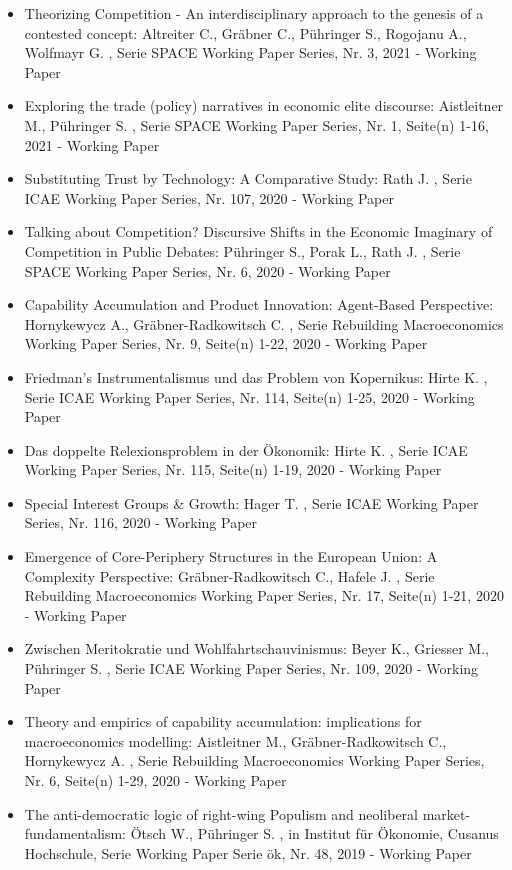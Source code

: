 \begin{itemize}
\item Theorizing Competition - An interdisciplinary approach to the genesis of a contested concept: Altreiter C., Gräbner C., Pühringer S., Rogojanu A., Wolfmayr G. , Serie SPACE Working Paper Series, Nr. 3, 2021 - Working Paper
\item Exploring the trade (policy) narratives in economic elite discourse: Aistleitner M., Pühringer S. , Serie SPACE Working Paper Series, Nr. 1, Seite(n) 1-16, 2021 - Working Paper
\item Substituting Trust by Technology: A Comparative Study: Rath J. , Serie ICAE Working Paper Series, Nr. 107, 2020 - Working Paper
\item Talking about Competition? Discursive Shifts in the Economic Imaginary of Competition in Public Debates: Pühringer S., Porak L., Rath J. , Serie SPACE Working Paper Series, Nr. 6, 2020 - Working Paper
\item Capability Accumulation and Product Innovation: Agent-Based Perspective: Hornykewycz A., Gräbner-Radkowitsch C. , Serie Rebuilding Macroeconomics Working Paper Series, Nr. 9, Seite(n) 1-22, 2020 - Working Paper
\item Friedman’s Instrumentalismus und das Problem von Kopernikus: Hirte K. , Serie ICAE Working Paper Series, Nr. 114, Seite(n) 1-25, 2020 - Working Paper
\item Das doppelte Relexionsproblem in der Ökonomik: Hirte K. , Serie ICAE Working Paper Series, Nr. 115, Seite(n) 1-19, 2020 - Working Paper
\item Special Interest Groups & Growth: Hager T. , Serie ICAE Working Paper Series, Nr. 116, 2020 - Working Paper
\item Emergence of Core-Periphery Structures in the European Union: A Complexity Perspective: Gräbner-Radkowitsch C., Hafele J. , Serie Rebuilding Macroeconomics Working Paper Series, Nr. 17, Seite(n) 1-21, 2020 - Working Paper
\item Zwischen Meritokratie und Wohlfahrtschauvinismus: Beyer K., Griesser M., Pühringer S. , Serie ICAE Working Paper Series, Nr. 109, 2020 - Working Paper
\item Theory and empirics of capability accumulation: implications for macroeconomics modelling: Aistleitner M., Gräbner-Radkowitsch C., Hornykewycz A. , Serie Rebuilding Macroeconomics Working Paper Series, Nr. 6, Seite(n) 1-29, 2020 - Working Paper
\item The anti-democratic logic of right-wing Populism and neoliberal market-fundamentalism: Ötsch W., Pühringer S. , in Institut für Ökonomie, Cusanus Hochschule, Serie Working Paper Serie ök, Nr. 48, 2019 - Working Paper

\end{itemize}
